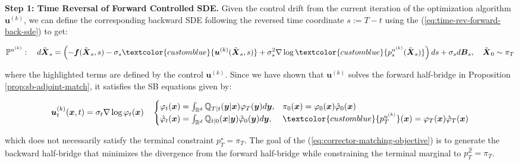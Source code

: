 \documentclass{article}
\newcommand{\bluetext}[1]{\textcolor{customblue}{#1}}
\begin{document}
\textbf{Step 1: Time Reversal of Forward Controlled SDE. }
Given the control drift from the current iteration of the optimization algorithm $\boldsymbol{u}^{(k)}$, we can define the corresponding backward SDE following the reversed time coordinate $s:= T-t$ using the (\ref{eq:time-rev-forward-back-sde}) to get:
\begin{small}
\begin{align}
    \mathbb{P}^{u^{(k)}}: \quad d\tilde{\boldsymbol{X}}_s=\left(-\boldsymbol{f}(\tilde{\boldsymbol{X}}_s,s)-\sigma_s\bluetext{\boldsymbol{u}^{(k)}(\tilde{\boldsymbol{X}}_s,s)}+\sigma_s^2\nabla \log \bluetext{p^{u^{(k)}}_s(\tilde{\boldsymbol{X}}_s)}\right)ds + \sigma_sd\boldsymbol{B}_s, \quad \tilde{\boldsymbol{X}}_0\sim \pi_T\label{eq:k-control-time-reversal}
\end{align}
\end{small}
where the highlighted terms are defined by the control $\boldsymbol{u}^{(k)}$. Since we have shown that $\boldsymbol{u}^{(k)}$ solves the forward half-bridge in Proposition \ref{prop:sb-adjoint-match}, it satisfies the SB equations given by:
\begin{small}
\begin{align}
    \boldsymbol{u}^{(k)}_t(\boldsymbol{x},t)=\sigma_t\nabla \log \varphi_t(\boldsymbol{x})\quad 
    \begin{cases}
        \varphi_t(\boldsymbol{x})=\int_{\mathbb{R}^d}\mathbb{Q}_{T|t}(\boldsymbol{y}|\boldsymbol{x})\varphi_T(\boldsymbol{y})d\boldsymbol{y}, & \pi_0(\boldsymbol{x})=\varphi_0(\boldsymbol{x})\hat{\varphi}_0(\boldsymbol{x})\\
        \hat{\varphi}_t(\boldsymbol{x})=\int_{\mathbb{R}^d}\mathbb{Q}_{t|0}(\boldsymbol{x}|\boldsymbol{y})\hat{\varphi}_0(\boldsymbol{y})d\boldsymbol{y}, & \bluetext{p^{u^{(k)}}_T}(\boldsymbol{x})=\varphi_T(\boldsymbol{x})\hat{\varphi}_T(\boldsymbol{x})\label{eq:k-control-time-reversal2}
    \end{cases}
\end{align}
\end{small}
which does not necessarily satisfy the terminal constraint $p_T^\star=\pi_T$. The goal of the (\ref{eq:corrector-matching-objective}) is to generate the backward half-bridge that minimizes the divergence from the forward half-bridge while constraining the terminal marginal to $p^{\widehat{Z}}_T=\pi_T$.
\end{document}

